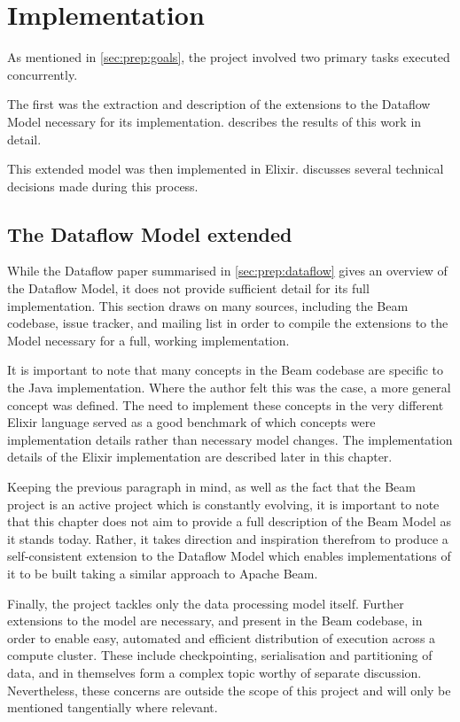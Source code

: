 \chapter{Implementation}\label{ch:impl}

As mentioned in \cref{sec:prep:goals}, the project involved two primary tasks executed concurrently.

The first was the extraction and description of the extensions to the Dataflow Model necessary for its implementation.
 describes the results of this work in detail.

This extended model was then implemented in Elixir.
 discusses several technical decisions made during this process.

\section{The Dataflow Model extended}\label{sec:impl:dataflow}

While the Dataflow paper \cite{Akidau:2015} summarised in \cref{sec:prep:dataflow} gives an overview of the Dataflow Model, it does not provide sufficient detail for its full implementation.
This section draws on many sources, including the Beam codebase, issue tracker, and mailing list in order to compile the extensions to the Model necessary for a full, working implementation.

It is important to note that many concepts in the Beam codebase are specific to the Java implementation.
Where the author felt this was the case, a more general concept was defined.
The need to implement these concepts in the very different Elixir language served as a good benchmark of which concepts were implementation details rather than necessary model changes.
The implementation details of the Elixir implementation are described later in this chapter.

Keeping the previous paragraph in mind, as well as the fact that the Beam project is an active project which is constantly evolving, it is important to note that this chapter does not aim to provide a full description of the Beam Model as it stands today.
Rather, it takes direction and inspiration therefrom to produce a self-consistent extension to the Dataflow Model which enables implementations of it to be built taking a similar approach to Apache Beam.

Finally, the project tackles only the data processing model itself.
Further extensions to the model are necessary, and present in the Beam codebase, in order to enable easy, automated and efficient distribution of execution across a compute cluster.
These include checkpointing, serialisation and partitioning of data, and in themselves form a complex topic worthy of separate discussion.
Nevertheless, these concerns are outside the scope of this project and will only be mentioned tangentially where relevant.

